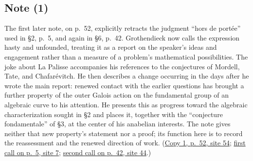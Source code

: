 \subsection*{Note (1)}
The first later note, on p.~52, explicitly retracts the judgment ``hors
de portée'' used in \S2, p.~5, and again in \S6, p.~42. Grothendieck now
calls the expression hasty and unfounded, treating it as a report on the
speaker's ideas and engagement rather than a measure of a problem's
mathematical possibilities. The joke about La Palisse accompanies his
references to the conjectures of Mordell, Tate, and Chafarévitch. He then
describes a change occurring in the days after he wrote the main report:
renewed contact with the earlier questions has brought a further property
of the outer Galois action on the fundamental group of an algebraic curve
to his attention. He presents this as progress toward the algebraic
characterization sought in \S2 and places it, together with the
``conjecture fondamentale'' of \S3, at the center of his anabelian
interests. The note gives neither that new property's statement nor a
proof; its function here is to record the reassessment and the renewed
direction of work.
(\href{https://grothendieck.umontpellier.fr/web/viewer.html?file=../119.pdf\#page=55}{Copy 1, p.~52, site 54};
\href{https://grothendieck.umontpellier.fr/web/viewer.html?file=../119.pdf\#page=8}{first call on p.~5, site 7};
\href{https://grothendieck.umontpellier.fr/web/viewer.html?file=../119.pdf\#page=45}{second call on p.~42, site 44}.)
